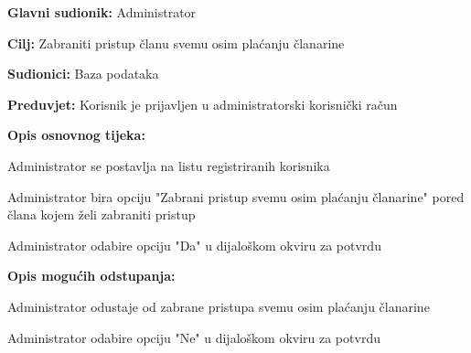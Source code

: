 		\noindent {}
		\begin{packed_item}
			
			\item \textbf{Glavni sudionik: } Administrator
			\item  \textbf{Cilj: } Zabraniti pristup članu svemu osim plaćanju članarine
			\item  \textbf{Sudionici: } Baza podataka
			\item  \textbf{Preduvjet: } Korisnik je prijavljen u administratorski korisnički račun
			\item  \textbf{Opis osnovnog tijeka:}
			
			\item[] \begin{packed_enum}
				
				\item Administrator se postavlja na listu registriranih korisnika
				\item Administrator bira opciju "Zabrani pristup svemu osim plaćanju članarine" pored člana kojem želi zabraniti pristup
				\item Administrator odabire opciju "Da" u dijaloškom okviru za potvrdu
			\end{packed_enum}
			
			\item  \textbf{Opis mogućih odstupanja:}
			
			\item[] \begin{packed_item}
				
				\item[2.a] Administrator odustaje od zabrane pristupa svemu osim plaćanju članarine
				\item[] \begin{packed_enum}
					
					\item Administrator odabire opciju "Ne" u dijaloškom okviru za potvrdu
					
				\end{packed_enum}
			\end{packed_item}
			
		\end{packed_item}
		
